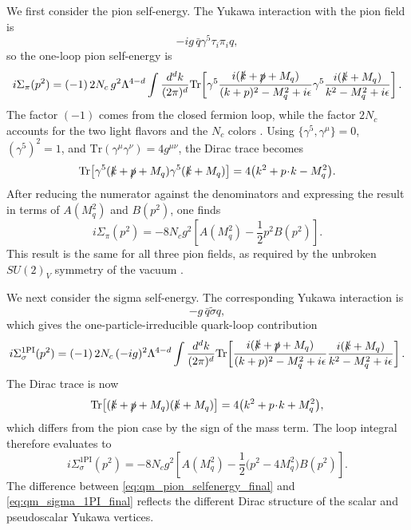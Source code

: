 We first consider the pion self-energy. The Yukawa interaction with
the pion field is
\begin{equation}
-ig\,\bar q \gamma^5 \tau_i \pi_i q ,
\end{equation}
so the one-loop pion self-energy is
\begin{equation}
i\Sigma_\pi(p^2)
=
(-1)\,2N_c\,g^2 \Lambda^{4-d}
\int\frac{d^d k}{(2\pi)^d}
\mathrm{Tr}\!\left[
\gamma^5
\frac{i(\slashed{k}+\slashed{p}+M_q)}{(k+p)^2-M_q^2+i\epsilon}
\gamma^5
\frac{i(\slashed{k}+M_q)}{k^2-M_q^2+i\epsilon}
\right].
\label{eq:qm_sigma_pi_start}
\end{equation}
The factor \((-1)\) comes from the closed fermion loop, while the
factor \(2N_c\) accounts for the two light flavors and the \(N_c\)
colors \cite{Folkestad2018}. Using
\(\{\gamma^5,\gamma^\mu\}=0\), \((\gamma^5)^2=1\), and
\(\mathrm{Tr}(\gamma^\mu\gamma^\nu)=4g^{\mu\nu}\), the Dirac trace becomes
\begin{equation}
\mathrm{Tr}\!\left[
\gamma^5(\slashed{k}+\slashed{p}+M_q)\gamma^5(\slashed{k}+M_q)
\right]
=
4\bigl(k^2+p\!\cdot\! k-M_q^2\bigr).
\end{equation}
After reducing the numerator against the denominators and expressing
the result in terms of \(A(M_q^2)\) and \(B(p^2)\), one finds
\begin{equation}
i\Sigma_\pi(p^2)
=
-8N_c g^2
\left[
A(M_q^2)-\frac{1}{2}p^2 B(p^2)
\right].
\label{eq:qm_pion_selfenergy_final}
\end{equation}
This result is the same for all three pion fields, as required by the
unbroken \(SU(2)_V\) symmetry of the vacuum \cite{Folkestad2018}.

We next consider the sigma self-energy. The corresponding Yukawa
interaction is
\begin{equation}
-g\,\bar q \tilde{\sigma} q ,
\end{equation}
which gives the one-particle-irreducible quark-loop contribution
\begin{equation}
i\Sigma_{\sigma}^{\mathrm{1PI}}(p^2)
=
(-1)\,2N_c\,(-ig)^2 \Lambda^{4-d}
\int\frac{d^d k}{(2\pi)^d}
\mathrm{Tr}\!\left[
\frac{i(\slashed{k}+\slashed{p}+M_q)}{(k+p)^2-M_q^2+i\epsilon}
\frac{i(\slashed{k}+M_q)}{k^2-M_q^2+i\epsilon}
\right].
\label{eq:qm_sigma_selfenergy_start}
\end{equation}
The Dirac trace is now
\begin{equation}
\mathrm{Tr}\!\left[
(\slashed{k}+\slashed{p}+M_q)(\slashed{k}+M_q)
\right]
=
4\bigl(k^2+p\!\cdot\! k+M_q^2\bigr),
\end{equation}
which differs from the pion case by the sign of the mass term. The
loop integral therefore evaluates to
\begin{equation}
i\Sigma_{\sigma}^{\mathrm{1PI}}(p^2)
=
-8N_c g^2
\left[
A(M_q^2)-\frac{1}{2}\bigl(p^2-4M_q^2\bigr)B(p^2)
\right].
\label{eq:qm_sigma_1PI_final}
\end{equation}
The difference between \eqref{eq:qm_pion_selfenergy_final} and
\eqref{eq:qm_sigma_1PI_final} reflects the different Dirac structure
of the scalar and pseudoscalar Yukawa vertices.

